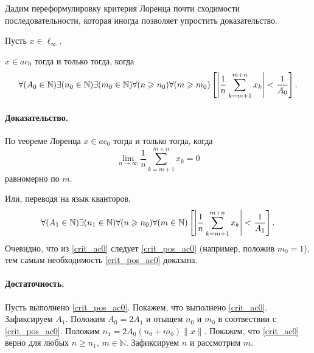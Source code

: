 Дадим переформулировку критерия Лоренца
\cite{lorentz1948contribution,bennett1974consistency}
почти сходимости последовательности,
которая иногда позволяет упростить доказательство.


\begin{theorem}
	Пусть $x\in\ell_\infty$.

	$x\in ac_0$ тогда и только тогда, когда
	\begin{equation}\label{crit_pos_ac0}
		\forall(A_0\in\mathbb{N})
		\exists(n_0\in\mathbb{N})
		\exists(m_0\in\mathbb{N})
		\forall(n\geq n_0)
		\forall(m\geq m_0)
		\\
		\left[
			\left|
			\frac{1}{n}
			\sum_{k=m+1}^{m+n} x_k
			\right|
			<
			\frac{1}{A_0}
		\right]
		.
	\end{equation}

\end{theorem}

\paragraph{Доказательство.}
По теореме Лоренца $x\in ac_0$ тогда и только тогда, когда
\begin{equation}\label{Lorencz_ac0}
	\lim_{n\to\infty} \frac{1}{n} \sum_{k=m+1}^{m+n} x_k = 0
\end{equation}
равномерно по $m$.

Или, переводя на язык кванторов,
\begin{equation}\label{crit_ac0}
	\forall(A_1\in\mathbb{N})
	\exists(n_1\in\mathbb{N})
	\forall(n\geq n_0)
	\forall(m \in \mathbb{N})
	\\
	\left[
		\left|
		\frac{1}{n}
		\sum_{k=m+1}^{m+n} x_k
		\right|
		<
		\frac{1}{A_1}
	\right]
	.
\end{equation}
Очевидно, что из \eqref{crit_ac0} следует \eqref{crit_pos_ac0} (например, положив $m_0 = 1$),
тем самым необходимость \eqref{crit_pos_ac0} доказана.

\paragraph{Достаточность.}
Пусть выполнено \eqref{crit_pos_ac0}.
Покажем, что выполнено \eqref{crit_ac0}.
Зафиксируем $A_1$.
Положим $A_0 = 2A_1$ и отыщем $n_0$ и $m_0$ в соотвествии с \eqref{crit_pos_ac0}.
Положим $n_1 = 2A_0(n_0+m_0)\|x\|$.
Покажем, что \eqref{crit_ac0} верно для любых $n\geq n_1$, $m\in \mathbb{N}$.
Зафиксируем $n$ и рассмотрим $m$.

